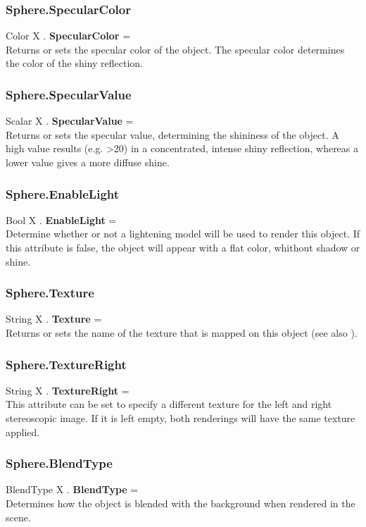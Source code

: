 \subsubsection{Sphere.SpecularColor \label{F:Sphere:SpecularColor}}
Color X . \textbf{SpecularColor} = \\
Returns or sets the specular color of the object. The specular color determines the color of the shiny reflection.

\subsubsection{Sphere.SpecularValue \label{F:Sphere:SpecularValue}}
Scalar X . \textbf{SpecularValue} = \\
Returns or sets the specular value, determining the shininess of the object. A high value results (e.g. >20) in a concentrated, intense shiny reflection, whereas a lower value gives a more diffuse shine.

\subsubsection{Sphere.EnableLight \label{F:Sphere:EnableLight}}
Bool X . \textbf{EnableLight} = \\
Determine whether or not a lightening model will be used to render this object. If this attribute is false, the object will appear with a flat color, whithout shadow or shine.

\subsubsection{Sphere.Texture \label{F:Sphere:Texture}}
String X . \textbf{Texture} = \\
Returns or sets the name of the texture that is mapped on this object (see also ).

\subsubsection{Sphere.TextureRight \label{F:Sphere:TextureRight}}
String X . \textbf{TextureRight} = \\
This attribute can be set to specify a different texture for the left and right stereoscopic image. If it is left empty, both renderings will have the same texture applied.

\subsubsection{Sphere.BlendType \label{F:Sphere:BlendType}}
BlendType X . \textbf{BlendType} = \\
Determines how the object is blended with the background when rendered in the scene.

